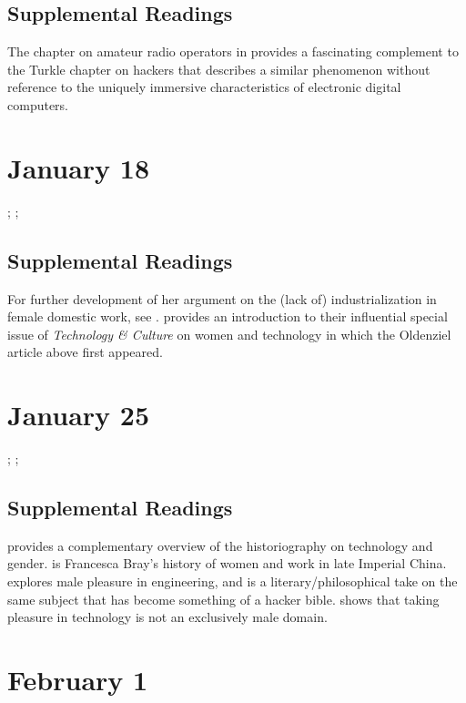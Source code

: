 \documentclass[11pt]{article}
\begin{document}


\subsection{Supplemental Readings}

\noindent The chapter on amateur radio operators in \cite{Douglas1987} provides a fascinating complement to the Turkle chapter on hackers that describes a similar phenomenon without reference to the uniquely immersive characteristics of electronic digital computers.  

\section{January 18}

; ; 

\subsection{Supplemental Readings}

For further development of her argument on the (lack of) industrialization in female domestic work, see \cite{Cowan1983}. \cite{Lerman1997} provides an introduction to their influential special issue of \emph{Technology \& Culture} on women and technology in which the Oldenziel article above first appeared.

\section{January 25}

; ; 

\subsection{Supplemental Readings}

\cite{Wajcman2000} provides a complementary overview of the historiography on technology and gender.  \cite{Bray1997} is Francesca Bray’s history of women and work in late Imperial China.   \cite{Florman1996} explores male pleasure in engineering, and \cite{Pirsig1974} is a literary/philosophical take on the same subject that has become something of a hacker bible.   \cite{Ullman1997} shows that taking pleasure in technology is not an exclusively male domain. 

\section{February 1}
\end{document}
